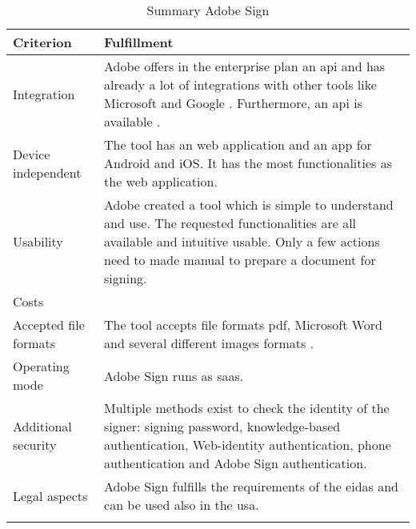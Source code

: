	\begin{longtable}{|p{4cm}|p{10cm}|} \hline
		Criterion & Fulfillment \\ \hline
		Integration & Adobe offers in the enterprise plan an \gls{api} and has already a lot of integrations with other tools like Microsoft and Google \parencite{adobesign2018integration,adobesign2018info}. Furthermore, an \gls{api} is available \parencite{adobesign2018api}. \\ \hline
		Device independent & The tool has an web application and an \gls{app} for Android and iOS. It has the most functionalities as the web application. \\ \hline
		Usability & Adobe created a tool which is simple to understand and use. The requested functionalities are all available and intuitive usable. Only a few actions need to made manual to prepare a document for signing. \\ \hline
		Costs & \\ \hline
		Accepted file formats & The tool accepts file formats \gls{pdf}, Microsoft Word and several different images formats \parencite{adobesign2018info}. \\ \hline
		Operating mode & Adobe Sign runs as \gls{saas}. \parencite{adobesign2016} \\ \hline
		Additional security & Multiple methods exist to check the identity of the signer: signing password, knowledge-based authentication, Web-identity authentication, phone authentication and Adobe Sign authentication. \parencite{adobesign2018security} \\ \hline
		Legal aspects & Adobe Sign fulfills the requirements of the \gls{eidas} and can be used also in the \gls{usa}. \parencite{adobesign2018legal}\\ \hline
	\caption{Summary Adobe Sign}
	\label{tab:adobesign}
	\end{longtable}

